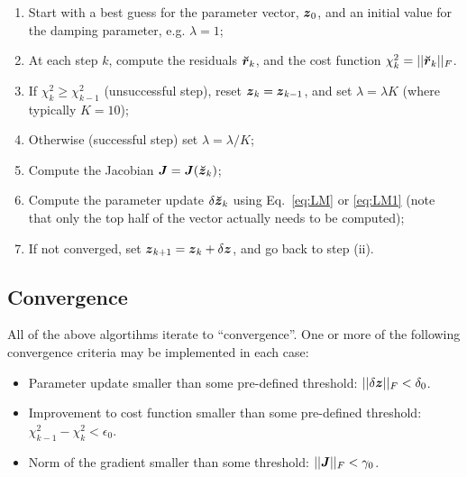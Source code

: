 \documentclass[useAMS,usenatbib]{mn2e}
\newcommand{\zz}{\bmath{z}}
\newcommand{\mat}[1]{{\bmath{#1}}}
\newcommand{\JJ}{\mat{J}} %
\begin{document}
\begin{enumerate}
\item Start with a best guess for the parameter vector, $\bmath{z}_0$, and an initial value
for the damping parameter, e.g. $\lambda=1$;
\item At each step $k$, compute the residuals $\Rr_k$, and the cost function $\chi^2_k=||\Rr_k||_F$.
\item If $\chi^2_k\ge\chi^2_{k-1}$ (unsuccessful step), reset $\zz_k=\zz_{k-1}$, and set $\lambda=\lambda K$ (where typically $K=10$);
\item Otherwise (successful step) set $\lambda=\lambda/K$;
\item Compute the Jacobian $\JJ=\JJ(\Zz_k)$;
\item Compute the parameter update $\delta\Zz_k$ using Eq.~\ref{eq:LM} or \ref{eq:LM1} (note that only the top half of the vector actually needs to be computed);
\item If not converged, set $\bmath{z}_{k+1}=\bmath{z}_k+\delta\zz$, and go back to step (ii).
\end{enumerate}

\subsection{Convergence}

All of the above algortihms iterate to ``convergence''. One or more of the following convergence criteria may be implemented in each case:

\begin{itemize}
\item Parameter update smaller than some pre-defined threshold: $||\delta \bmath{z}||_F<\delta_0$.
\item Improvement to cost function smaller than some pre-defined threshold: $\chi^2_{k-1}-\chi^2_{k}<\epsilon_0$.
\item Norm of the gradient smaller than some threshold:  $||\JJ||_F<\gamma_0$.
\end{itemize}



\label{lastpage}
\end{document}

